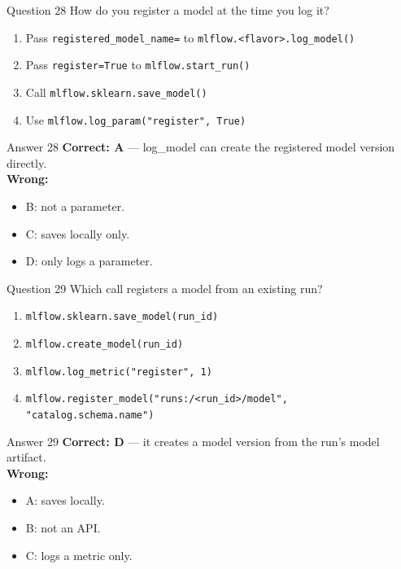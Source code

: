 \documentclass[aspectratio=169,11pt]{beamer}
\begin{document}
	\begin{frame}{Question 28}
		How do you register a model at the time you log it?
		\begin{enumerate}[label=\Alph*.]
			\item Pass \texttt{registered\_model\_name=} to \texttt{mlflow.<flavor>.log\_model()}
			\item Pass \texttt{register=True} to \texttt{mlflow.start\_run()}
			\item Call \texttt{mlflow.sklearn.save\_model()}
			\item Use \texttt{mlflow.log\_param("register", True)}
		\end{enumerate}
	\end{frame}
	\begin{frame}{Answer 28}
		\textbf{Correct: A} --- log\_model can create the registered model version directly.\\
		\vspace{0.5em}
		\textbf{Wrong:}
		\begin{itemize}
			\item B: not a parameter.
			\item C: saves locally only.
			\item D: only logs a parameter.
		\end{itemize}
	\end{frame}
	
	\begin{frame}{Question 29}
		Which call registers a model from an existing run?
		\begin{enumerate}[label=\Alph*.]
			\item \texttt{mlflow.sklearn.save\_model(run\_id)}
			\item \texttt{mlflow.create\_model(run\_id)}
			\item \texttt{mlflow.log\_metric("register", 1)}
			\item \texttt{mlflow.register\_model("runs:/<run\_id>/model", "catalog.schema.name")}
		\end{enumerate}
	\end{frame}
	\begin{frame}{Answer 29}
		\textbf{Correct: D} --- it creates a model version from the run's model artifact.\\
		\vspace{0.5em}
		\textbf{Wrong:}
		\begin{itemize}
			\item A: saves locally.
			\item B: not an API.
			\item C: logs a metric only.
		\end{itemize}
	\end{frame}
	
\end{document}
